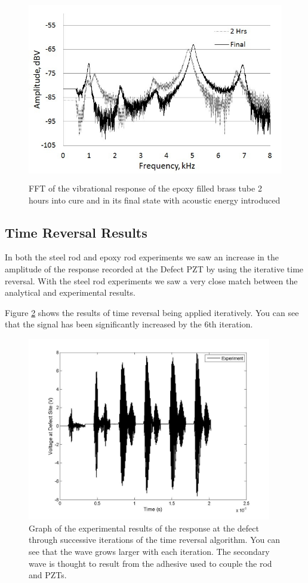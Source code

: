 \documentclass[]{aiaa-tc}%
\begin{document}
\begin{figure}[H]%
\centering
 \includegraphics[height = 8cm]{epoxy_fft_sound}
 \caption{FFT of the vibrational response of the epoxy filled brass tube 2 hours into cure and in its final state with acoustic energy introduced}
 \label{fig:epoxy_fft_sound}
\end{figure}

\subsection{Time Reversal Results}

In both the steel rod and epoxy rod experiments we saw an increase in the amplitude of the response recorded at the Defect PZT by using the iterative time reversal. With the steel rod experiments we saw a very close match between the analytical and experimental results.  

Figure \ref{fig:tr_steel2} shows the results of time reversal being applied iteratively. You can see that the signal has been significantly increased by the 6th iteration. 

\begin{figure}[H]%
\centering
 \includegraphics[height = 8cm]{tr_steel2}
 \caption{Graph of the experimental results of the response at the defect through successive iterations of the time reversal algorithm. You can see that the wave grows larger with each iteration. The secondary wave is thought to result from the adhesive used to couple the rod and PZTs.}
 \label{fig:tr_steel2}
\end{figure}
\end{document}
